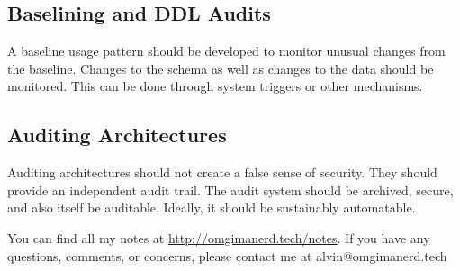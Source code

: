 \documentclass{math}
\begin{document}
\subsection*{Baselining and DDL Audits}
A baseline usage pattern should be developed to monitor unusual changes from
the baseline. Changes to the schema as well as changes to the data should be
monitored. This can be done through system triggers or other mechanisms.

\subsection*{Auditing Architectures}
Auditing architectures should not create a false sense of security. They should
provide an independent audit trail. The audit system should be archived, secure,
and also itself be auditable. Ideally, it should be sustainably automatable.

\begin{center}
  You can find all my notes at \url{http://omgimanerd.tech/notes}. If you have
  any questions, comments, or concerns, please contact me at
  alvin@omgimanerd.tech
\end{center}
\end{document}
